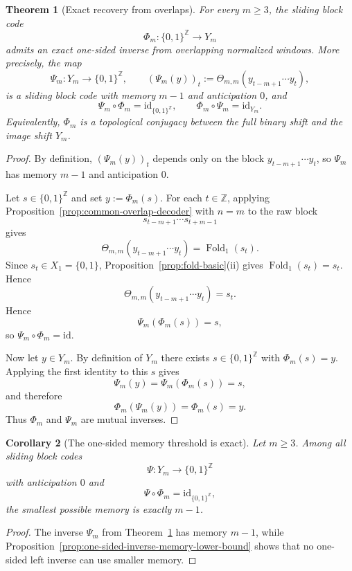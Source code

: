 \documentclass[11pt,letterpaper]{article}
\numberwithin{equation}{section}
\theoremstyle{plain}
\newtheorem{theorem}{Theorem}[section]
\newtheorem{corollary}[theorem]{Corollary}
\theoremstyle{definition}
\theoremstyle{remark}
\newcommand{\ZZ}{\mathbb{Z}}
\DeclareMathOperator{\Fold}{Fold}
\begin{document}
\begin{theorem}[Exact recovery from overlaps]
\label{thm:Phi-m-conjugacy-threshold}
For every $m\ge 3$, the sliding block code
\[
\Phi_m:\{0,1\}^{\ZZ}\to Y_m
\]
admits an exact one-sided inverse from overlapping normalized windows.  More
precisely, the map
\[
\Psi_m:Y_m\to\{0,1\}^{\ZZ},
\qquad
(\Psi_m(y))_t:=\Theta_{m,m}(y_{t-m+1}\cdots y_t),
\]
is a sliding block code with memory $m-1$ and anticipation $0$, and
\[
\Psi_m\circ\Phi_m=\mathrm{id}_{\{0,1\}^{\ZZ}},
\qquad
\Phi_m\circ\Psi_m=\mathrm{id}_{Y_m}.
\]
Equivalently, $\Phi_m$ is a topological conjugacy between the full binary
shift and the image shift $Y_m$.
\end{theorem}

\begin{proof}
By definition, $(\Psi_m(y))_t$ depends only on the block
$y_{t-m+1}\cdots y_t$, so $\Psi_m$ has memory $m-1$ and anticipation $0$.

Let $s\in\{0,1\}^{\ZZ}$ and set $y:=\Phi_m(s)$.  For each $t\in\ZZ$, applying
Proposition~\ref{prop:common-overlap-decoder} with $n=m$ to the raw block
\[
s_{t-m+1}\cdots s_{t+m-1}
\]
gives
\[
\Theta_{m,m}(y_{t-m+1}\cdots y_t)=\Fold_1(s_t).
\]
Since $s_t\in X_1=\{0,1\}$, Proposition~\ref{prop:fold-basic}\textup{(ii)}
gives $\Fold_1(s_t)=s_t$.  Hence
\[
\Theta_{m,m}(y_{t-m+1}\cdots y_t)=s_t.
\]
Hence
\[
\Psi_m(\Phi_m(s))=s,
\]
so $\Psi_m\circ\Phi_m=\mathrm{id}$.

Now let $y\in Y_m$.  By definition of $Y_m$ there exists
$s\in\{0,1\}^{\ZZ}$ with $\Phi_m(s)=y$.  Applying the first identity to this
$s$ gives
\[
\Psi_m(y)=\Psi_m(\Phi_m(s))=s,
\]
and therefore
\[
\Phi_m(\Psi_m(y))=\Phi_m(s)=y.
\]
Thus $\Phi_m$ and $\Psi_m$ are mutual inverses.
\end{proof}

\begin{corollary}[The one-sided memory threshold is exact]
\label{cor:Phi-m-memory-threshold-exact}
Let $m\ge 3$.  Among all sliding block codes
\[
\Psi:Y_m\to\{0,1\}^{\ZZ}
\]
with anticipation $0$ and
\[
\Psi\circ\Phi_m=\mathrm{id}_{\{0,1\}^{\ZZ}},
\]
the smallest possible memory is exactly $m-1$.
\end{corollary}

\begin{proof}
The inverse $\Psi_m$ from Theorem~\ref{thm:Phi-m-conjugacy-threshold} has
memory $m-1$, while
Proposition~\ref{prop:one-sided-inverse-memory-lower-bound} shows that no
one-sided left inverse can use smaller memory.
\end{proof}
\end{document}
